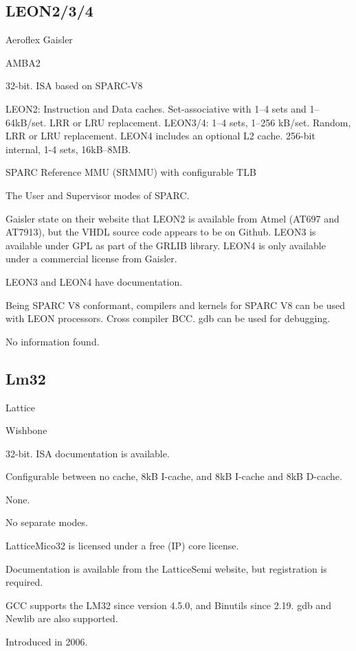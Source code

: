 \subsection{LEON2/3/4}
\begin{description}[style=nextline]
\item[Developer] Aeroflex Gaisler
\item[Bus Used] AMBA2
\item[Architecture] 32-bit. ISA based on SPARC-V8
\item[Cache] LEON2: Instruction and Data caches. Set-associative with 1--4 sets and 1--64kB/set. LRR or LRU replacement. LEON3/4: 1--4 sets, 1--256 kB/set. Random, LRR or LRU replacement. LEON4 includes an optional L2 cache. 256-bit internal, 1-4 sets, 16kB--8MB.
\item[MMU] SPARC Reference MMU (SRMMU) with configurable TLB
\item[User Levels] The User and Supervisor modes of SPARC.
\item[License] Gaisler state on their website that LEON2 is available from Atmel (AT697 and AT7913)\cite{gaisler}, but the VHDL source code appears to be on Github.\cite{leon2} LEON3 is available under GPL as part of the GRLIB library.\cite{grlib} LEON4 is only available under a commercial license from Gaisler.
\item[Documentation] LEON3\cite{leon3} and LEON4\cite{leon4} have documentation.
\item[Toolchain] Being SPARC V8 conformant, compilers and kernels for SPARC V8 can be used with LEON processors. Cross compiler BCC.\cite{bcc} gdb can be used for debugging.
\item[Maturity] No information found.
\end{description}

\subsection{Lm32}
\begin{description}[style=nextline]
\item[Developer] Lattice
\item[Bus Used] Wishbone
\item[Architecture] 32-bit. ISA documentation is available.\cite{lm32-isa}
\item[Cache] Configurable between no cache, 8kB I-cache, and 8kB I-cache and 8kB D-cache.
\item[MMU] None.
\item[User Levels] No separate modes.
\item[License] LatticeMico32 is licensed under a free (IP) core license.
\item[Documentation] Documentation is available from the LatticeSemi website, but registration is required.\cite{lm32-doc}
\item[Toolchain] GCC supports the LM32 since version 4.5.0, and Binutils since 2.19. gdb and Newlib are also supported.
\item[Maturity] Introduced in 2006.
\end{description}

